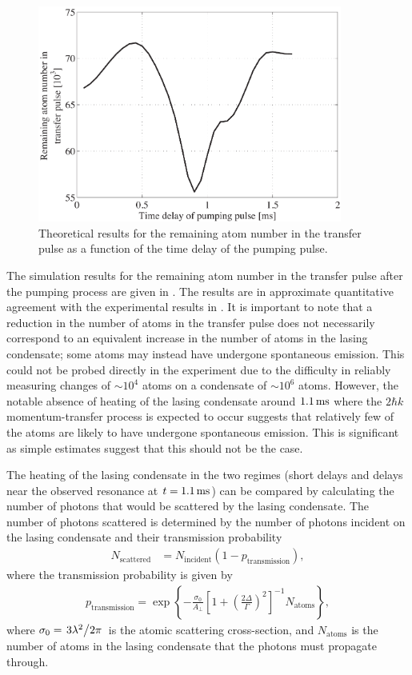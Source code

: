 \begin{figure}
    \centering
    \includegraphics[width=10cm]{PulsedPumpingTheoryTransferPulseNumber}
    \caption{Theoretical results for the remaining atom number in the transfer pulse as a function of the time delay of the pumping pulse.}
    \label{OpticalPumping:PulsedPumpingTheoryTransferPulseNumber}
\end{figure}

The simulation results for the remaining atom number in the transfer pulse after the pumping process are given in .  The results are in approximate quantitative agreement with the experimental results in .  It is important to note that a reduction in the number of atoms in the transfer pulse does not necessarily correspond to an equivalent increase in the number of atoms in the lasing condensate; some atoms may instead have undergone spontaneous emission.  This could not be probed directly in the experiment due to the difficulty in reliably measuring changes of $\sim 10^4$ atoms on a condensate of $\sim 10^6$ atoms.  However, the notable absence of heating of the lasing condensate around $\unit[1.1]{ms}$ where the $2 \hbar k$ momentum-transfer process is expected to occur suggests that relatively few of the atoms are likely to have undergone spontaneous emission.  This is significant as simple estimates suggest that this should not be the case.

The heating of the lasing condensate in the two regimes (short delays and delays near the observed resonance at $t = \unit[1.1]{ms}$) can be compared by calculating the number of photons that would be scattered by the lasing condensate.  The number of photons scattered is determined by the number of photons incident on the lasing condensate and their transmission probability
\begin{align}
    N_\text{scattered} &= N_\text{incident} (1 - p_\text{transmission}),
\end{align}
where the transmission probability is given by
\begin{align}
    p_\text{transmission} = \exp \left\{- \frac{\sigma_0}{A_\perp} \left[1 + \left(\frac{2 \Delta}{\Gamma}\right)^2\right]^{-1} N_\text{atoms}  \right\},
\end{align}
where $\sigma_0 = \left.{3 \lambda^2}\middle/{2 \pi}\right.$ is the atomic scattering cross-section, and $N_\text{atoms}$ is the number of atoms in the lasing condensate that the photons must propagate through.


